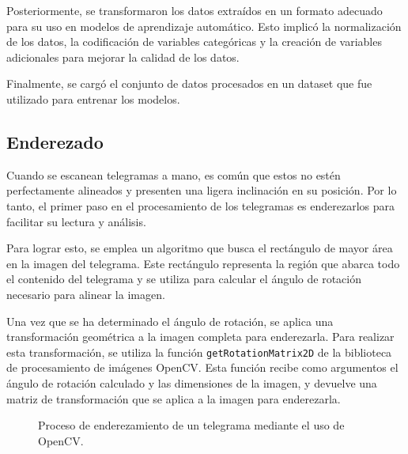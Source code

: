 Posteriormente, se transformaron los datos extraídos en un formato adecuado para su uso en modelos de aprendizaje
automático. Esto implicó la normalización de los datos, la codificación de variables categóricas y la creación de
variables adicionales para mejorar la calidad de los datos.

Finalmente, se cargó el conjunto de datos procesados en un dataset que fue utilizado para entrenar los modelos.

\subsection{Enderezado}
Cuando se escanean telegramas a mano, es común que estos no estén perfectamente alineados y presenten una ligera
inclinación en su posición. Por lo tanto, el primer paso en el procesamiento de los telegramas es enderezarlos para
facilitar su lectura y análisis.

Para lograr esto, se emplea un algoritmo que busca el rectángulo de mayor área en la imagen del telegrama. Este
rectángulo representa la región que abarca todo el contenido del telegrama y se utiliza para calcular el ángulo de
rotación necesario para alinear la imagen.

Una vez que se ha determinado el ángulo de rotación, se aplica una transformación geométrica a la imagen completa para
enderezarla. Para realizar esta transformación, se utiliza la función \verb|getRotationMatrix2D| de la biblioteca de
procesamiento de imágenes OpenCV. Esta función recibe como argumentos el ángulo de rotación calculado y las dimensiones
de la imagen, y devuelve una matriz de transformación que se aplica a la imagen para enderezarla.

\begin{figure}[H]
    \centering



    \caption{Proceso de enderezamiento de un telegrama mediante el uso de OpenCV.}
    \label{fig:etl-1-rotacion}
\end{figure}

